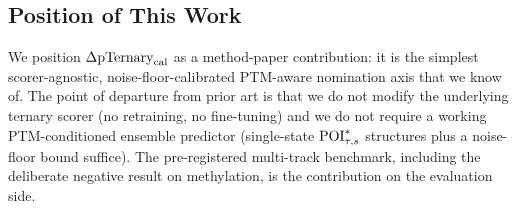 \subsection{Position of This Work}

We position $\Delta\mathrm{pTernary}_{\mathrm{cal}}$ as a method-paper contribution: it is the simplest scorer-agnostic, noise-floor-calibrated PTM-aware nomination axis that we know of. The point of departure from prior art is that we do not modify the underlying ternary scorer (no retraining, no fine-tuning) and we do not require a working PTM-conditioned ensemble predictor (single-state $\mathrm{POI}^{*}_{\tau,s}$ structures plus a noise-floor bound suffice). The pre-registered multi-track benchmark, including the deliberate negative result on methylation, is the contribution on the evaluation side.
